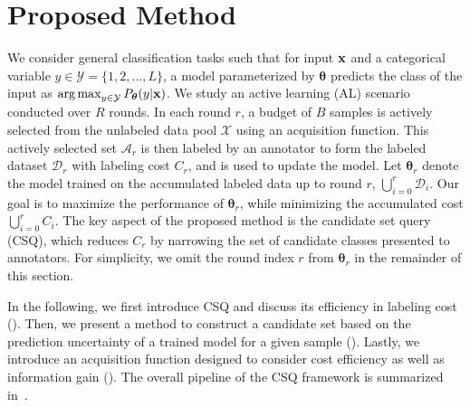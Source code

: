 \section{Proposed Method}
\label{sec:method}
We consider general classification tasks such that for input $\mathbf{x}$ and a categorical variable $y \in \mathcal{Y} = \{1,2, \ldots, L\}$, a model parameterized by $\boldsymbol{\theta}$ predicts the class of the input as $\operatorname*{arg\,max}_{y \in \mathcal{Y}} P_{\boldsymbol{\theta}}(y|\mathbf{x})$.
We study an active learning (AL) scenario conducted over $R$ rounds.
In each round $r$, a budget of $B$ samples is actively selected from the unlabeled data pool $\mathcal{X}$ using an acquisition function.
This actively selected set $\mathcal{A}_r$ is then labeled by an annotator to form the labeled dataset $\mathcal{D}_{r}$ with labeling cost $C_r$, and is used to update the model.
Let $\boldsymbol{\theta}_r$ denote the model trained on the accumulated labeled data up to round $r$, $\bigcup_{i=0}^{r}\mathcal{D}_{i}$.  
Our goal is to maximize the performance of $\boldsymbol{\theta}_r$, while minimizing the accumulated cost $\bigcup_{i=0}^{r} C_{i}$.
The key aspect of the proposed method is the candidate set query (CSQ), which reduces $C_r$ by narrowing the set of candidate classes presented to annotators.
For simplicity, we omit the round index $r$ from $\boldsymbol{\theta}_r$ in the remainder of this section.

In the following, we first introduce CSQ and discuss its efficiency in labeling cost ().
Then, we present a method to construct a candidate set based on the prediction uncertainty of a trained model for a given sample ().
Lastly, we introduce an acquisition function designed to consider cost efficiency as well as information gain ().
The overall pipeline of the CSQ framework is summarized in~.



